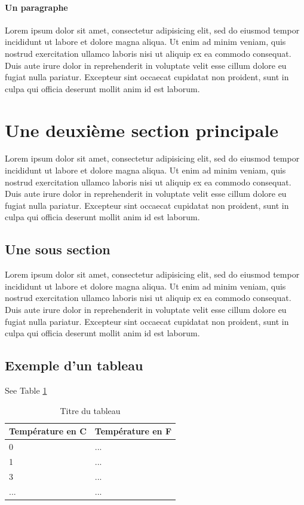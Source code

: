 \paragraph{Un paragraphe}
Lorem ipsum dolor sit amet, consectetur adipisicing elit, sed do eiusmod
tempor incididunt ut labore et dolore magna aliqua. Ut enim ad minim veniam,
quis nostrud exercitation ullamco laboris nisi ut aliquip ex ea commodo
consequat. Duis aute irure dolor in reprehenderit in voluptate velit esse
cillum dolore eu fugiat nulla pariatur. Excepteur sint occaecat cupidatat non
proident, sunt in culpa qui officia deserunt mollit anim id est laborum.

\section{Une deuxième section principale}
Lorem ipsum dolor sit amet, consectetur adipisicing elit, sed do eiusmod
tempor incididunt ut labore et dolore magna aliqua. Ut enim ad minim veniam,
quis nostrud exercitation ullamco laboris nisi ut aliquip ex ea commodo
consequat. Duis aute irure dolor in reprehenderit in voluptate velit esse
cillum dolore eu fugiat nulla pariatur. Excepteur sint occaecat cupidatat non
proident, sunt in culpa qui officia deserunt mollit anim id est laborum.

\subsection{Une sous section}
Lorem ipsum dolor sit amet, consectetur adipisicing elit, sed do eiusmod
tempor incididunt ut labore et dolore magna aliqua. Ut enim ad minim veniam,
quis nostrud exercitation ullamco laboris nisi ut aliquip ex ea commodo
consequat. Duis aute irure dolor in reprehenderit in voluptate velit esse
cillum dolore eu fugiat nulla pariatur. Excepteur sint occaecat cupidatat non
proident, sunt in culpa qui officia deserunt mollit anim id est laborum.

\subsection{Exemple d'un tableau}

See Table \ref{tab:tableau1}

\begin{table}[h!]
\begin{center}
	\begin{tabular}{|l|l|}
		\hline
		\textbf{Température en C} & \textbf{Température en F} \\
		\hline
		\hline
		0 & ... \\
		\hline
		1 & ... \\
		\hline
		3 & ... \\
		\hline
		... & ... \\
		\hline
	\end{tabular}
\end{center}
\caption{Titre du tableau}
\label{tab:tableau1}
\end{table}

